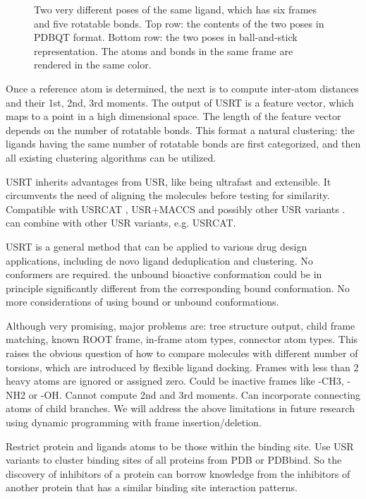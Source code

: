 \begin{figure}
\endminipage
\caption{Two very different poses of the same ligand, which has six frames and five rotatable bonds. Top row: the contents of the two poses in PDBQT format. Bottom row: the two poses in ball-and-stick representation. The atoms and bonds in the same frame are rendered in the same color.}
\label{usr:T27}
\end{figure}

Once a reference atom is determined, the next is to compute inter-atom distances and their 1st, 2nd, 3rd moments. The output of USRT is a feature vector, which maps to a point in a high dimensional space. The length of the feature vector depends on the number of rotatable bonds. This format a natural clustering: the ligands having the same number of rotatable bonds are first categorized, and then all existing clustering algorithms can be utilized.

USRT inherits advantages from USR, like being ultrafast and extensible. It circumvents the need of aligning the molecules before testing for similarity. Compatible with USRCAT \citep{1331}, USR+MACCS \citep{1333} and possibly other USR variants \citep{1334}. can combine with other USR variants, e.g. USRCAT.

USRT is a general method that can be applied to various drug design applications, including de novo ligand deduplication and clustering. No conformers are required. the unbound bioactive conformation could be in principle significantly different from the corresponding bound conformation. No more considerations of using bound or unbound conformations.

Although very promising, major problems are: tree structure output, child frame matching, known ROOT frame, in-frame atom types, connector atom types. This raises the obvious question of how to compare molecules with different number of torsions, which are introduced by flexible ligand docking. Frames with less than 2 heavy atoms are ignored or assigned zero. Could be inactive frames like -CH3, -NH2 or -OH. Cannot compute 2nd and 3rd moments. Can incorporate connecting atoms of child branches. We will address the above limitations in future research using dynamic programming with frame insertion/deletion.

Restrict protein and ligands atoms to be those within the binding site. Use USR variants to cluster binding sites of all proteins from PDB or PDBbind. So the discovery of inhibitors of a protein can borrow knowledge from the inhibitors of another protein that has a similar binding site interaction patterns.

\chapterend
